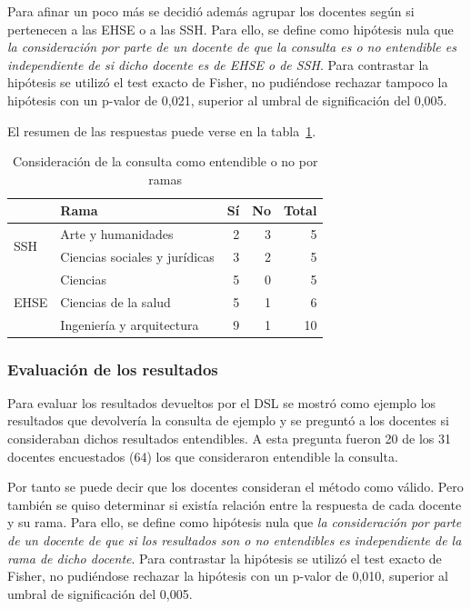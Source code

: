 Para afinar un poco más se decidió además agrupar los docentes según si pertenecen a las EHSE o a  las SSH. Para ello, se define como hipótesis nula que \emph{la consideración por parte de un docente de que la consulta es o no entendible es independiente de si  dicho docente es de EHSE o de SSH}. Para contrastar la hipótesis se utilizó el test exacto de Fisher, no pudiéndose rechazar tampoco la hipótesis con un p-valor de 0,021, superior al umbral de significación del 0,005.

El resumen de las respuestas puede verse en la tabla~\ref{tab:cap:encuesta:consulta:rama}.

\begin{table}
  \begin{center}
  \begin{tabular}{| l | l | r | r | r |}
    \hline
    & Rama & Sí & No & Total \\
    \hline
    \hline
    \multirow{2}{2.5cm}{SSH} & Arte y humanidades & 2 & 3 & 5  \\
    \cline{2-5}
    & Ciencias sociales y jurídicas & 3 & 2 & 5  \\
    \hline
    \multirow{3}{2.5cm}{EHSE} & Ciencias & 5 & 0 & 5  \\
    \cline{2-5}
    & Ciencias de la salud & 5 & 1 & 6  \\
    \cline{2-5}
    & Ingeniería y arquitectura & 9 & 1 & 10 \\
    \hline
  \end{tabular}
\end{center}
\caption{Consideración de la consulta como entendible o no por ramas}
\label{tab:cap:encuesta:consulta:rama}
\end{table}

\subsubsection{Evaluación de los resultados}

Para evaluar los resultados devueltos por el DSL se mostró como ejemplo los resultados que devolvería la consulta de ejemplo y se preguntó a los docentes si consideraban dichos resultados entendibles. A esta pregunta fueron 20 de los 31 docentes encuestados (64\percentage) los que consideraron entendible la consulta.

Por tanto se puede decir que los docentes consideran el método como válido. Pero también se quiso determinar si existía relación entre la respuesta de cada docente y su rama. Para ello, se define como hipótesis nula que \emph{la consideración por parte de un docente de que si los resultados son o no entendibles es independiente de la rama de dicho docente}. Para contrastar la hipótesis se utilizó el test exacto de Fisher, no pudiéndose rechazar la hipótesis con un p-valor de 0,010, superior al umbral de significación del 0,005.

